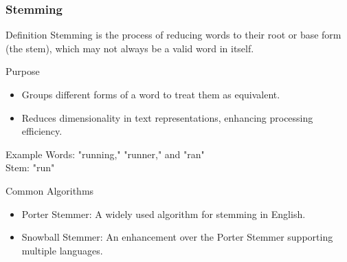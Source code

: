 \documentclass{beamer}
\begin{document}
\begin{frame}
    \frametitle{Stemming}
    \begin{block}{Definition}
        Stemming is the process of reducing words to their root or base form (the stem), which may not always be a valid word in itself.
    \end{block}

    \begin{block}{Purpose}
        \begin{itemize}
            \item Groups different forms of a word to treat them as equivalent.
            \item Reduces dimensionality in text representations, enhancing processing efficiency.
        \end{itemize}
    \end{block}

    \begin{block}{Example}
        Words: "running," "runner," and "ran" \\
        Stem: "run"
    \end{block}

    \begin{block}{Common Algorithms}
        \begin{itemize}
            \item Porter Stemmer: A widely used algorithm for stemming in English.
            \item Snowball Stemmer: An enhancement over the Porter Stemmer supporting multiple languages.
        \end{itemize}
    \end{block}
\end{frame}
\end{document}
